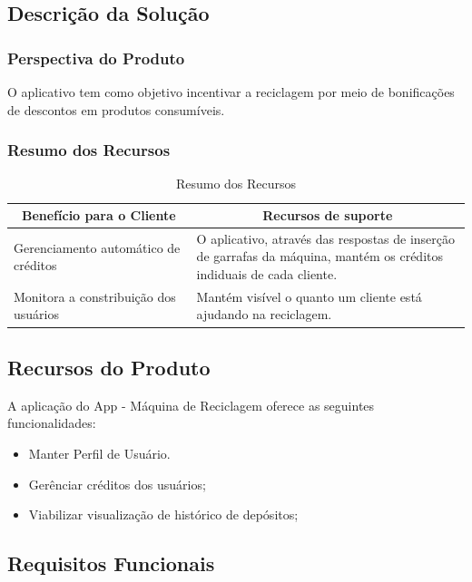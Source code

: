 \begin{apendicesenv}
\subsection{Descrição da Solução}

\subsubsection{Perspectiva do Produto}
O aplicativo tem como objetivo incentivar a reciclagem por meio de bonificações de descontos em produtos consumíveis.

\subsubsection{Resumo dos Recursos}
\begin{table}[htp]
    \centering
    \caption{Resumo dos Recursos}
    \label{my-label}
    \begin{tabular}{|p{0.40\linewidth}|p{0.60\linewidth}|}
        \hline
        \multicolumn{1}{|c|}{\textbf{Benefício para o Cliente}} & \multicolumn{1}{c|}{\textbf{Recursos de suporte}} \\ \hline
        Gerenciamento automático de créditos    & O aplicativo, através das respostas de inserção de garrafas da máquina, mantém os créditos indiduais de cada cliente. \\ \hline
        Monitora a constribuição dos usuários    & Mantém visível o quanto um cliente está ajudando na reciclagem. \\ \hline
    \end{tabular}
\end{table}

\subsection{Recursos do Produto}
A aplicação do App - Máquina de Reciclagem oferece as seguintes funcionalidades:

\begin{itemize}
    \item Manter Perfil de Usuário.
    \item Gerênciar créditos dos usuários;
    \item Viabilizar visualização de histórico de depósitos;
\end{itemize}

\subsection{Requisitos Funcionais}


\end{apendicesenv}
